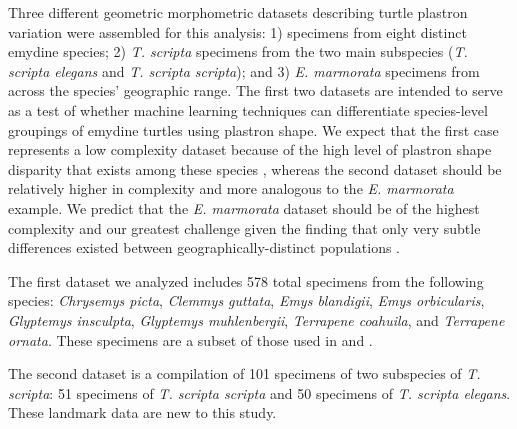 \documentclass[fleqn,10pt,lineno]{wlpeerj} %
\begin{document}
Three different geometric morphometric datasets describing turtle plastron variation were assembled for this analysis: 1) specimens from eight distinct emydine species; 2) \textit{T. scripta} specimens from the two main subspecies (\textit{T. scripta elegans} and \textit{T. scripta scripta}); and 3) \textit{E. marmorata} specimens from across the species' geographic range. The first two datasets are intended to serve as a test of whether machine learning techniques can differentiate species-level groupings of emydine turtles using plastron shape. We expect that the first case represents a low complexity dataset because of the high level of plastron shape disparity that exists among these species \citep{Claude2003a,Claude2006,Angielczyk2011}, whereas the second dataset should be relatively higher in complexity and more analogous to the \textit{E. marmorata} example. We predict that the \textit{E. marmorata} dataset should be of the highest complexity and our greatest challenge given the finding that only very subtle differences existed between geographically-distinct populations \citep{Holland1992}.

The first dataset we analyzed includes 578 total specimens from the following species: \textit{Chrysemys picta}, \textit{Clemmys guttata}, \textit{Emys blandigii}, \textit{Emys orbicularis}, \textit{Glyptemys insculpta}, \textit{Glyptemys muhlenbergii}, \textit{Terrapene coahuila}, and \textit{Terrapene ornata}. These specimens are a subset of those used in \citet{Angielczyk2011} and \citet{Angielczyk2013a}.

The second dataset is a compilation of 101 specimens of two subspecies of \textit{T. scripta}: 51 specimens of \textit{T. scripta scripta} and 50 specimens of \textit{T. scripta elegans}. These landmark data are new to this study. 
\end{document}
